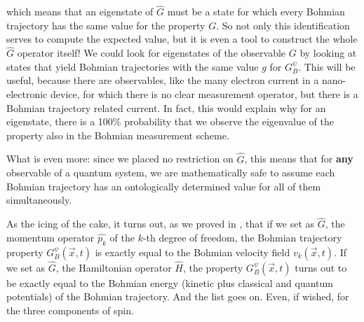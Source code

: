 \documentclass[11pt, a4paper]{article} %
\begin{document}
which means that an eigenstate of $\hat{G}$ must be a state for which every Bohmian trajectory has the same value for the property $G$. So not only this identification serves to compute the expected value, but it is even a tool to construct the whole $\hat{G}$ operator itself! We could look for eigenstates of the observable $G$ by looking at states that yield Bohmian trajectories with the same value $g$ for $G_B^\psi$. This will be useful, because there are observables, like the many electron current in a nano-electronic device, for which there is no clear measurement operator, but there is a Bohmian trajectory related current. In fact, this would explain why for an eigenstate, there is a 100\% probability that we observe the eigenvalue of the property also in the Bohmian measurement scheme.

What is even more: since we placed no restriction on $\hat{G}$, this means that for {\bf any} observable of a quantum system, we are mathematically safe to assume each Bohmian trajectory has an ontologically determined value for all of them simultaneously.

As the icing of the cake, it turns out, as we proved in \cite{DevInPosition1}, that if we set as $\hat{G}$, the momentum operator $\hat{p_k}$ of the $k$-th degree of freedom, the Bohmian trajectory property $G^\psi_B(\vec{x},t)$ is exactly equal to the Bohmian velocity field $v_k(\vec{x},t)$. If we set as $\hat{G}$, the Hamiltonian operator $\hat{H}$, the property $G^\psi_B(\vec{x},t)$ turns out to be exactly equal to the Bohmian energy (kinetic plus classical and quantum potentials) of the Bohmian trajectory. And the list goes on. Even, if wished, for the three components of spin.
\end{document}

